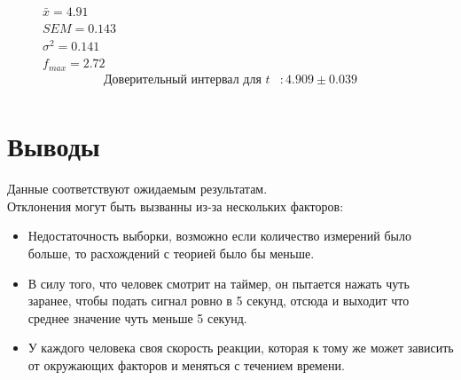 \documentclass[a4paper]{article}
\begin{document}
\begin{figure}[H]
	\\
	$\bar{x}=4.91$\\
	$SEM=0.143$\\
	$\sigma^2=0.141$\\
	$f_{max}=2.72$\\

\begin{align*}
\text{Доверительный интервал для } t &: 4.909 \pm 0.039\\
\end{align*}

\end{figure}


\section{Выводы}
Данные соответствуют ожидаемым результатам.\\Отклонения могут быть вызванны из-за нескольких факторов:
\begin{itemize}
	\item Недостаточность выборки, возможно если количество измерений было больше, то расхождений с теорией было бы меньше.
	\item В силу того, что человек смотрит на таймер, он пытается нажать чуть заранее, чтобы подать сигнал ровно в 5 секунд, отсюда и выходит что среднее значение чуть меньше 5 секунд.
	\item У каждого человека своя скорость реакции, которая к тому же может зависить от окружающих факторов и меняться с течением времени.
\end{itemize}
\end{document}
